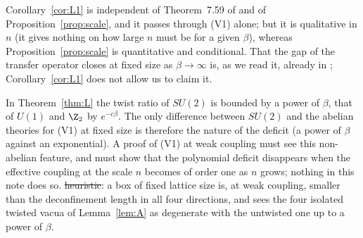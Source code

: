 Corollary~\ref{cor:L1} is independent of Theorem~7.59 of \cite{BB26v5} and of Proposition~\ref{prop:scale}, and it passes through (V1) alone; but it is qualitative in $n$ (it gives nothing on how large $n$ must be for a given $\beta$), whereas Proposition~\ref{prop:scale} is quantitative and conditional. That the gap of the transfer operator closes at fixed size as $\beta\to\infty$ is, as we read it, already in \cite{BB26v5}; Corollary~\ref{cor:L1} does not allow us to claim it.

\begin{remark}\label{rem:L-comparison}
In Theorem~\ref{thm:L} the twist ratio of $SU(2)$ is bounded by a power of $\beta$, that of $U(1)$ and $\Z_2$ by $e^{-c\beta}$. The only difference between $SU(2)$ and the abelian theories for (V1) at fixed size is therefore the nature of the deficit (a power of $\beta$ against an exponential). A proof of (V1) at weak coupling must see this non-abelian feature, and must show that the polynomial deficit disappears when the effective coupling at the scale $n$ becomes of order one as $n$ grows; nothing in this note does so. \st{heuristic}: a box of fixed lattice size is, at weak coupling, smaller than the deconfinement length in all four directions, and sees the four isolated twisted vacua of Lemma~\ref{lem:A} as degenerate with the untwisted one up to a power of $\beta$.
\end{remark}
